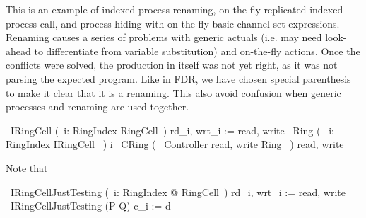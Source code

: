 \documentclass{article}
\begin{document}
This is an example of indexed process renaming,
on-the-fly replicated indexed process call, and
process hiding with on-the-fly basic channel set expressions.
Renaming causes a series of problems with generic actuals (i.e. may need look-ahead to differentiate
from variable substitution) and on-the-fly actions.
Once the conflicts were solved, the production in itself was not yet right, as it was not parsing the expected program.
Like in FDR, we have chosen special parenthesis to make it clear that it is a renaming. This also avoid confusion when
generic processes and renaming are used together.
%
\begin{circus}
  \circprocess\ IRingCell \circdef (~i: RingIndex \circindex RingCell~) \lcircrename rd\_i, wrt\_i := read, write \rcircrename
  \also
  \circprocess\ Ring \circdef (~ \Interleave i: RingIndex \circindex IRingCell ~) \circlinst i \circrinst
  \also
  \circprocess\ CRing \circdef (~ Controller \lpar \lchanset read, write \rchanset \rpar Ring ~) \circhide \lchanset read, write \rchanset
\end{circus}
%
Note that
\begin{circus}
  \circprocess\ IRingCellJustTesting \circdef (~i: RingIndex @ RingCell~) \lcircrename rd\_i, wrt\_i := read, write \rcircrename
  \also
  \circprocess\ IRingCellJustTesting \circdef (P \extchoice Q) \lcircrename c\_i := d \rcircrename

\end{circus}
\end{document}
